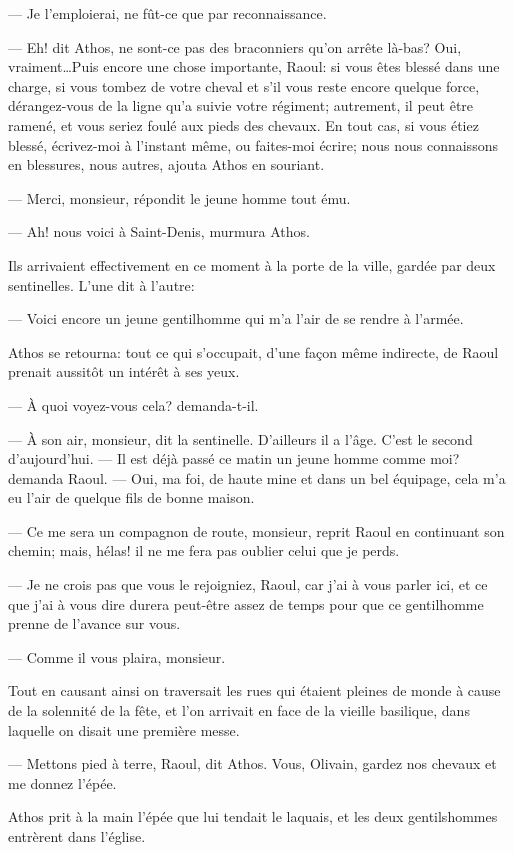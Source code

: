 — Je l'emploierai, ne fût-ce que par reconnaissance.

— Eh! dit Athos, ne sont-ce pas des braconniers qu'on arrête là-bas? Oui, vraiment\dots Puis encore une chose importante, Raoul: si vous êtes blessé dans une charge, si vous tombez de votre cheval et s'il vous reste encore quelque force, dérangez-vous de la ligne qu'a suivie votre régiment; autrement, il peut être ramené, et vous seriez foulé aux pieds des chevaux. En tout cas, si vous étiez blessé, écrivez-moi à l'instant même, ou faites-moi écrire; nous nous connaissons en blessures, nous autres, ajouta Athos en souriant.

— Merci, monsieur, répondit le jeune homme tout ému.

— Ah! nous voici à Saint-Denis, murmura Athos.

Ils arrivaient effectivement en ce moment à la porte de la ville, gardée par deux sentinelles. L'une dit à l'autre:

— Voici encore un jeune gentilhomme qui m'a l'air de se rendre à l'armée.

Athos se retourna: tout ce qui s'occupait, d'une façon même indirecte, de Raoul prenait aussitôt un intérêt à ses yeux.

— À quoi voyez-vous cela? demanda-t-il.

— À son air, monsieur, dit la sentinelle. D'ailleurs il a l'âge. C'est le second d'aujourd'hui.
— Il est déjà passé ce matin un jeune homme comme moi? demanda Raoul.
— Oui, ma foi, de haute mine et dans un bel équipage, cela m'a eu l'air de quelque fils de bonne maison.

— Ce me sera un compagnon de route, monsieur, reprit Raoul en continuant son chemin; mais, hélas! il ne me fera pas oublier celui que je perds.

— Je ne crois pas que vous le rejoigniez, Raoul, car j'ai à vous parler ici, et ce que j'ai à vous dire durera peut-être assez de temps pour que ce gentilhomme prenne de l'avance sur vous.

— Comme il vous plaira, monsieur.

Tout en causant ainsi on traversait les rues qui étaient pleines de monde à cause de la solennité de la fête, et l'on arrivait en face de la vieille basilique, dans laquelle on disait une première messe.

— Mettons pied à terre, Raoul, dit Athos. Vous, Olivain, gardez nos chevaux et me donnez l'épée.

Athos prit à la main l'épée que lui tendait le laquais, et les deux gentilshommes entrèrent dans l'église.


